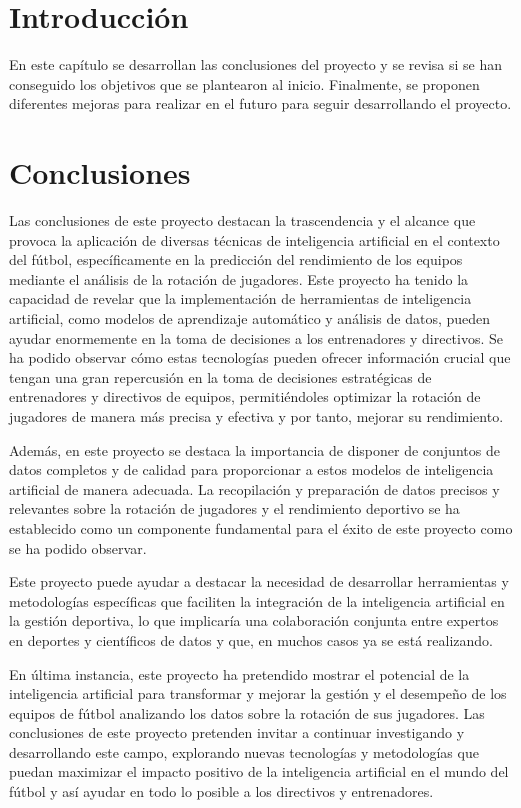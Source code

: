 
\section{Introducción}
En este capítulo se desarrollan las conclusiones del proyecto y se revisa si se han conseguido los objetivos que se plantearon al inicio. Finalmente, se proponen diferentes mejoras para realizar en el futuro para seguir desarrollando el proyecto.


\section{Conclusiones}
Las conclusiones de este proyecto destacan la trascendencia y el alcance que provoca la aplicación de diversas técnicas de inteligencia artificial en el contexto del fútbol, específicamente en la predicción del rendimiento de los equipos mediante el análisis de la rotación de jugadores. Este proyecto ha tenido la capacidad de revelar que la implementación de herramientas de inteligencia artificial, como modelos de aprendizaje automático y análisis de datos, pueden ayudar enormemente en la toma de decisiones a los entrenadores y directivos. Se ha podido observar cómo estas tecnologías pueden ofrecer información crucial que tengan una gran repercusión en la toma de decisiones estratégicas de entrenadores y directivos de equipos, permitiéndoles optimizar la rotación de jugadores de manera más precisa y efectiva y por tanto, mejorar su rendimiento.

Además, en este proyecto se destaca la importancia de disponer de conjuntos de datos completos y de calidad para proporcionar a estos modelos de inteligencia artificial de manera adecuada. La recopilación y preparación de datos precisos y relevantes sobre la rotación de jugadores y el rendimiento deportivo se ha establecido como un componente fundamental para el éxito de este proyecto como se ha podido observar. 

Este proyecto puede ayudar a destacar la necesidad de desarrollar herramientas y metodologías específicas que faciliten la integración de la inteligencia artificial en la gestión deportiva, lo que implicaría una colaboración conjunta entre expertos en deportes y científicos de datos y que, en muchos casos ya se está realizando.

En última instancia, este proyecto ha pretendido mostrar el potencial de la inteligencia artificial para transformar y mejorar la gestión y el desempeño de los equipos de fútbol analizando los datos sobre la rotación de sus jugadores. Las conclusiones de este proyecto pretenden invitar a continuar investigando y desarrollando este campo, explorando nuevas tecnologías y metodologías que puedan maximizar el impacto positivo de la inteligencia artificial en el mundo del fútbol y así ayudar en todo lo posible a los directivos y entrenadores.

